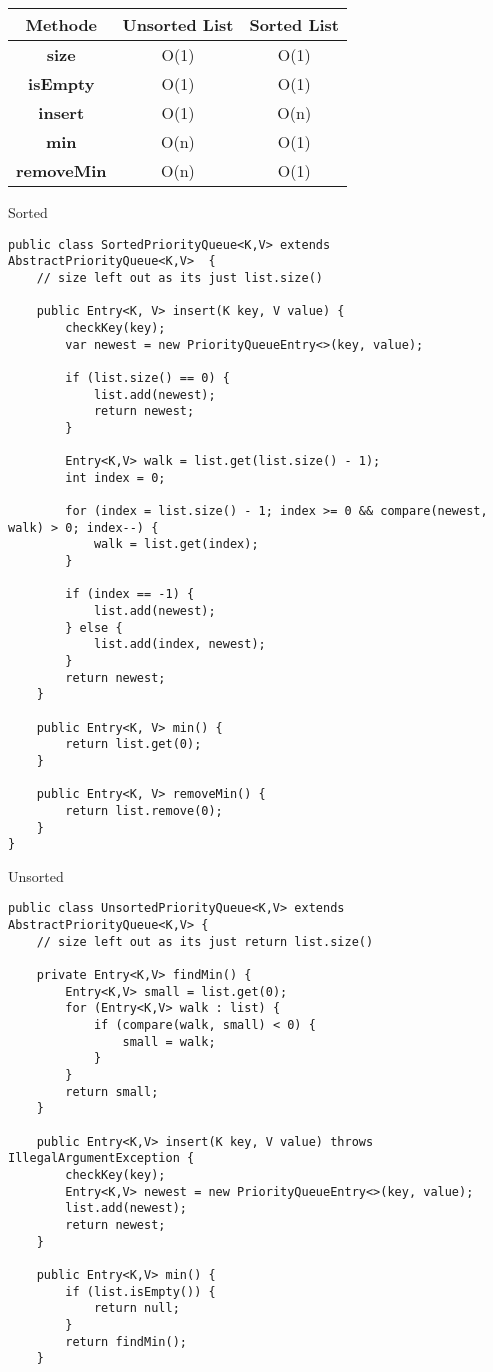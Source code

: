 \begin{multicols*}{4}
		\begin{tabular}{c | c | c}
			\textbf{Methode} & \textbf{Unsorted List} & \textbf{Sorted List} \\
			\hline
			\textbf{size} & O(1) & O(1) \\
			\textbf{isEmpty} & O(1) & O(1) \\
			\textbf{insert} & O(1) & O(n) \\
			\textbf{min} & O(n) & O(1) \\
			\textbf{removeMin} & O(n) & O(1) \\
		\end{tabular}
	
	Sorted
	\begin{lstlisting}
public class SortedPriorityQueue<K,V> extends AbstractPriorityQueue<K,V>  {
	// size left out as its just list.size()
	
	public Entry<K, V> insert(K key, V value) {		
		checkKey(key);
		var newest = new PriorityQueueEntry<>(key, value);
		
		if (list.size() == 0) {
			list.add(newest);
			return newest;
		}
		
		Entry<K,V> walk = list.get(list.size() - 1);
		int index = 0;
		
		for (index = list.size() - 1; index >= 0 && compare(newest, walk) > 0; index--) {
			walk = list.get(index);	
		}
		
		if (index == -1) {
			list.add(newest);
		} else {
			list.add(index, newest);
		}
		return newest;
	}
	
	public Entry<K, V> min() {
		return list.get(0);
	}
	
	public Entry<K, V> removeMin() {
		return list.remove(0);
	}
}
	\end{lstlisting}

	Unsorted
	\begin{lstlisting}
public class UnsortedPriorityQueue<K,V> extends AbstractPriorityQueue<K,V> {
	// size left out as its just return list.size()
	
	private Entry<K,V> findMin() {
		Entry<K,V> small = list.get(0);
		for (Entry<K,V> walk : list) {
			if (compare(walk, small) < 0) {
				small = walk;
			}
		}
		return small;
	}
	
	public Entry<K,V> insert(K key, V value) throws IllegalArgumentException {
		checkKey(key);
		Entry<K,V> newest = new PriorityQueueEntry<>(key, value);
		list.add(newest);
		return newest;
	}

	public Entry<K,V> min() {
		if (list.isEmpty()) {
			return null;
		}
		return findMin();
	}


\end{lstlisting}
\end{multicols*}
